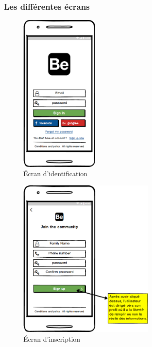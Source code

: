 \subsubsection{Les différentes écrans}
\begin{figure}[H]
	\begin{center}
		\includegraphics[height=8cm]{Images/chapter3/wireframe/sign_in.png}
		\caption{{\footnotesize Écran d'identification}}
	\end{center}
\end{figure}

\begin{figure}[H]
	\begin{center}
		\includegraphics[height=8cm]{Images/chapter3/wireframe/sign_up.png}
		\caption{{\footnotesize Écran d'inscription}}
	\end{center}
\end{figure}

